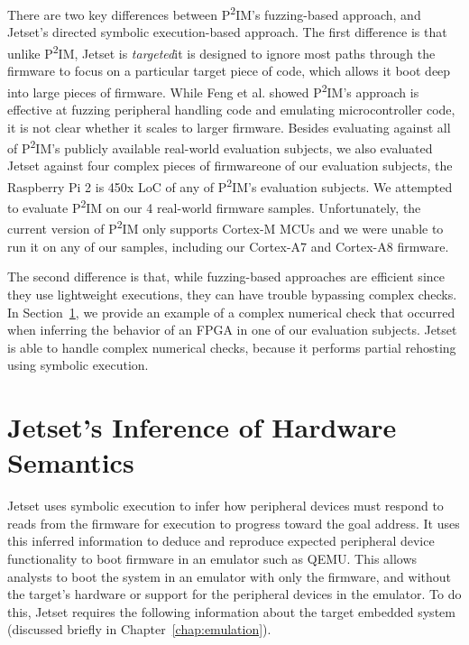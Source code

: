 There are two key differences between P\textsuperscript{2}IM's fuzzing-based approach, and Jetset's directed symbolic execution-based approach.
The first difference is that unlike P\textsuperscript{2}IM, Jetset is \textit{targeted}\textemdash it is designed to ignore most paths through the firmware to focus on a particular target piece of code, which allows it boot deep into large pieces of firmware.
While Feng et al. showed P\textsuperscript{2}IM's approach is effective at fuzzing peripheral handling code and emulating microcontroller code, it is not clear whether it scales to larger firmware.
Besides evaluating against all of P\textsuperscript{2}IM's publicly available real-world evaluation subjects, we also evaluated Jetset against four complex pieces of firmware\textemdash one of our evaluation subjects, the Raspberry Pi 2 is 450x LoC of any of P\textsuperscript{2}IM's evaluation subjects.
We attempted to evaluate P\textsuperscript{2}IM on our 4 real-world firmware samples. Unfortunately, the current version of P\textsuperscript{2}IM only supports Cortex-M MCUs and we were unable to run it on any of our samples, including our Cortex-A7 and Cortex-A8 firmware.

The second difference is that, while fuzzing-based approaches are efficient since they use lightweight executions, they can have trouble bypassing complex checks. 
In Section~\ref{sec:jetset-eval}, we provide an example of a complex numerical check that occurred when inferring the behavior of an FPGA in one of our evaluation subjects.
Jetset is able to handle complex numerical checks, because it performs partial rehosting using symbolic execution.

\section{Jetset's Inference of Hardware Semantics}
\label{sec:jetset-eval}

Jetset uses symbolic execution to infer how peripheral devices must respond to reads from the firmware for execution to progress toward the goal address.
It uses this inferred information to deduce and reproduce expected peripheral device functionality to boot firmware in an emulator such as QEMU.
This allows analysts to boot the system in an emulator with only the firmware, and without the target's hardware or support for the peripheral devices in the emulator.
To do this, Jetset requires the following information about the target embedded system (discussed briefly in Chapter~\ref{chap:emulation}).

